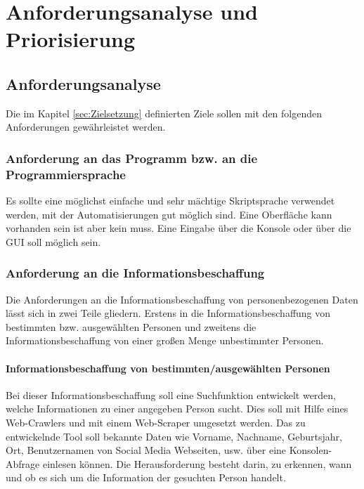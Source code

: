 
\chapter{Anforderungsanalyse und Priorisierung}  %
\label{cha:Anforderungsanalyse und Prioriesierung} %
\section{Anforderungsanalyse} %
\label{sec:Anforderunsanalyse} %
Die im Kapitel \ref{sec:Zielsetzung} definierten Ziele sollen mit den folgenden Anforderungen gewährleistet werden.
	\subsection{Anforderung an das Programm bzw. an die Programmiersprache}
	Es sollte eine möglichst einfache und sehr mächtige Skriptsprache verwendet werden, mit der Automatisierungen gut möglich sind. Eine Oberfläche kann vorhanden sein ist aber kein muss. Eine Eingabe über die Konsole oder über die GUI soll möglich sein. %
	\subsection{Anforderung an die Informationsbeschaffung}
	Die Anforderungen an die Informationsbeschaffung von personenbezogenen Daten lässt sich in zwei Teile gliedern. Erstens in die Informationsbeschaffung von bestimmten bzw. ausgewählten Personen und zweitens die Informationsbeschaffung von einer großen Menge unbestimmter Personen.
	
		\subsubsection{Informationsbeschaffung von bestimmten/ausgewählten Personen}
		Bei dieser Informationsbeschaffung soll eine Suchfunktion entwickelt werden, welche Informationen zu einer angegeben Person sucht. Dies soll mit Hilfe eines Web-Crawlers und mit einem Web-Scraper umgesetzt werden. Das zu entwickelnde Tool soll bekannte Daten wie Vorname, Nachname, Geburtsjahr, Ort, Benutzernamen von Social Media Webseiten, usw. über eine Konsolen-Abfrage einlesen können. Die Herausforderung besteht darin, zu erkennen, wann und ob es sich um die Information der gesuchten Person handelt.
	
